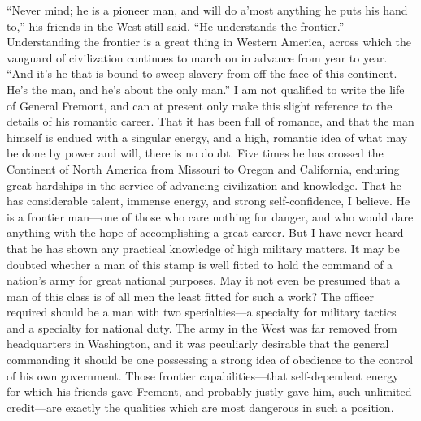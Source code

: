 ``Never mind; he is a pioneer man, and will do a'most anything he
puts his hand to,'' his friends in the West still said.  ``He
understands the frontier.''  Understanding the frontier is a great
thing in Western America, across which the vanguard of civilization
continues to march on in advance from year to year.  ``And it's he
that is bound to sweep slavery from off the face of this continent.
He's the man, and he's about the only man.''  I am not qualified to
write the life of General Fremont, and can at present only make
this slight reference to the details of his romantic career.  That
it has been full of romance, and that the man himself is endued
with a singular energy, and a high, romantic idea of what may be
done by power and will, there is no doubt.  Five times he has
crossed the Continent of North America from Missouri to Oregon and
California, enduring great hardships in the service of advancing
civilization and knowledge.  That he has considerable talent,
immense energy, and strong self-confidence, I believe.  He is a
frontier man---one of those who care nothing for danger, and who
would dare anything with the hope of accomplishing a great career.
But I have never heard that he has shown any practical knowledge of
high military matters.  It may be doubted whether a man of this
stamp is well fitted to hold the command of a nation's army for
great national purposes.  May it not even be presumed that a man of
this class is of all men the least fitted for such a work?  The
officer required should be a man with two specialties---a specialty
for military tactics and a specialty for national duty.  The army
in the West was far removed from headquarters in Washington, and it
was peculiarly desirable that the general commanding it should be
one possessing a strong idea of obedience to the control of his own
government.  Those frontier capabilities---that self-dependent
energy for which his friends gave Fremont, and probably justly gave
him, such unlimited credit---are exactly the qualities which are
most dangerous in such a position.

